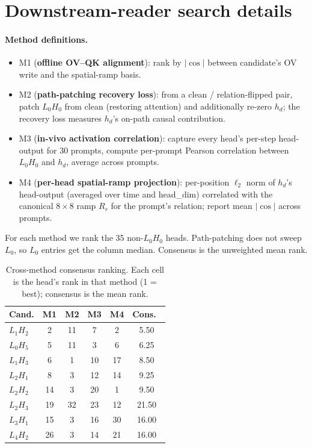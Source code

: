 \documentclass{article}
\theoremstyle{plain}
\theoremstyle{definition}
\begin{document}
\section{Downstream-reader search details}
\label{app:reader}

\paragraph{Method definitions.}
\begin{itemize}
\item M1 (\textbf{offline OV--QK alignment}): rank by $|\cos|$ between candidate's OV write and the spatial-ramp basis.
\item M2 (\textbf{path-patching recovery loss}): from a clean / relation-flipped pair, patch $L_0H_0$ from clean (restoring attention) and additionally re-zero $h_d$; the recovery loss measures $h_d$'s on-path causal contribution.
\item M3 (\textbf{in-vivo activation correlation}): capture every head's per-step head-output for 30 prompts, compute per-prompt Pearson correlation between $L_0H_0$ and $h_d$, average across prompts.
\item M4 (\textbf{per-head spatial-ramp projection}): per-position $\ell_2$ norm of $h_d$'s head-output (averaged over time and head\_dim) correlated with the canonical $8\!\times\!8$ ramp $R_r$ for the prompt's relation; report mean $|\cos|$ across prompts.
\end{itemize}
For each method we rank the 35 non-$L_0H_0$ heads. Path-patching does not sweep $L_0$, so $L_0$ entries get the column median. Consensus is the unweighted mean rank.

\begin{table}[h]
\centering
\small
\caption{Cross-method consensus ranking. Each cell is the head's rank in that method (1 = best); consensus is the mean rank.}
\label{tab:consensus}
\begin{tabular}{lccccc}
\toprule
Cand. & M1 & M2 & M3 & M4 & Cons.\ \\
\midrule
$L_1H_2$ &  2 & 11 &  7 &  2 &  5.50 \\
$L_0H_5$ &  5 & 11 &  3 &  6 &  6.25 \\
$L_1H_3$ &  6 &  1 & 10 & 17 &  8.50 \\
$L_2H_1$ &  8 &  3 & 12 & 14 &  9.25 \\
$L_2H_2$ & 14 &  3 & 20 &  1 &  9.50 \\
\midrule
$L_2H_3$ & 19 & 32 & 23 & 12 & 21.50 \\
$L_3H_1$ & 15 &  3 & 16 & 30 & 16.00 \\
$L_4H_2$ & 26 &  3 & 14 & 21 & 16.00 \\
\bottomrule
\end{tabular}
\end{table}
\end{document}
